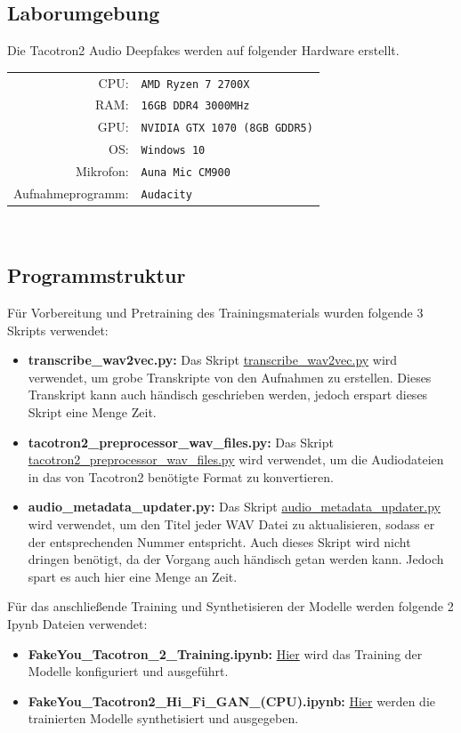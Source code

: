\subsection{Laborumgebung}
Die Tacotron2 Audio Deepfakes werden auf folgender Hardware erstellt.\\[0.5cm]
\begin{tabular}{rl}
    CPU:& \texttt{AMD Ryzen 7 2700X}\\
    RAM:& \texttt{16GB DDR4 3000MHz}\\
    GPU:& \texttt{NVIDIA GTX 1070 (8GB GDDR5)}\\
    OS:& \texttt{Windows 10}\\
    Mikrofon:& \texttt{Auna Mic CM900}\\
    Aufnahmeprogramm:& \texttt{Audacity}
\end{tabular}\\[0.5cm]
\subsection{Programmstruktur}
Für Vorbereitung und Pretraining des Trainingsmaterials wurden folgende 3 Skripts verwendet:
\begin{itemize}
    \item \textbf{transcribe\_wav2vec.py:} Das Skript \href{https://github.com/rasmurtech/Tacotron2-Wav2Vec-Transcription}{transcribe\_wav2vec.py} wird verwendet, um grobe Transkripte von den Aufnahmen zu erstellen. Dieses Transkript kann auch händisch geschrieben werden, jedoch erspart dieses Skript eine Menge Zeit.
    \item \textbf{tacotron2\_preprocessor\_wav\_files.py:} Das Skript \href{https://github.com/rasmurtech/Tacotron-2-Audio-Preprocessor}{tacotron2\_preprocessor\_wav\_files.py} wird verwendet, um die Audiodateien in das von Tacotron2 benötigte Format zu konvertieren.
    \item \textbf{audio\_metadata\_updater.py:} Das Skript \href{https://github.com/rasmurtech/Audio-Metadata-Updater}{audio\_metadata\_updater.py} wird verwendet, um den Titel jeder WAV Datei zu aktualisieren, sodass er der entsprechenden Nummer entspricht. Auch dieses Skript wird nicht dringen benötigt, da der Vorgang auch händisch getan werden kann. Jedoch spart es auch hier eine Menge an Zeit.
\end{itemize}
Für das anschließende Training und Synthetisieren der Modelle werden folgende 2 Ipynb Dateien verwendet:
\begin{itemize}
    \item \textbf{FakeYou\_Tacotron\_2\_Training.ipynb:} \href{https://colab.research.google.com/github/justinjohn0306/FakeYou-Tacotron2-Notebook/blob/dev/FakeYou_Tacotron_2_Training.ipynb}{Hier} wird das Training der Modelle konfiguriert und ausgeführt.
    \item \textbf{FakeYou\_Tacotron2\_Hi\_Fi\_GAN\_(CPU).ipynb:} \href{https://colab.research.google.com/github/justinjohn0306/FakeYou-Tacotron2-Notebook/blob/main/FakeYou_Tacotron2_Hi_Fi_GAN_(CPU).ipynb}{Hier} werden die trainierten Modelle synthetisiert und ausgegeben.
\end{itemize}
